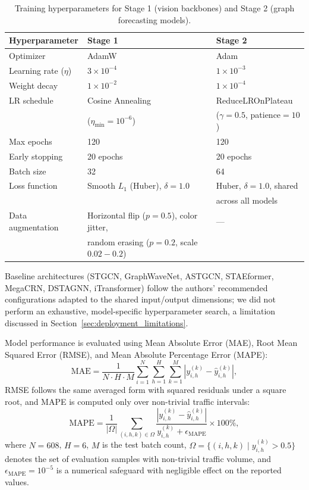 \documentclass[preprint,12pt]{elsarticle}
\begin{document}
\begin{table}[h]
\centering
\small
\caption{Training hyperparameters for Stage 1 (vision backbones) and Stage 2 (graph forecasting models).}
\label{tab:hyperparams}
\begin{tabular}{lll}
\toprule
\textbf{Hyperparameter} & \textbf{Stage 1} & \textbf{Stage 2} \\
\midrule
Optimizer & AdamW & Adam \citep{adam} \\
Learning rate ($\eta$) & $3\times10^{-4}$ & $1\times10^{-3}$ \\
Weight decay & $1\times10^{-2}$ & $1\times10^{-4}$ \\
LR schedule & Cosine Annealing & ReduceLROnPlateau \\
&($\eta_{\min}=10^{-6}$)  & ($\gamma=0.5$, patience$=10$) \\

Max epochs & 120 & 120 \\
Early stopping & 20 epochs & 20 epochs \\
Batch size & 32 & 64 \\
Loss function & Smooth $L_1$ (Huber), $\delta=1.0$  & Huber, $\delta=1.0$, shared\\
&  &  across all models \\

Data augmentation & Horizontal flip ($p{=}0.5$), color jitter, & --- \\
&   random erasing ($p{=}0.2$, scale $0.02{-}0.2$) &  \\

\bottomrule
\end{tabular}
\end{table}

Baseline architectures (STGCN, GraphWaveNet, ASTGCN, STAEformer, MegaCRN, DSTAGNN, iTransformer) follow the authors' recommended configurations adapted to the shared input/output dimensions; we did not perform an exhaustive, model-specific hyperparameter search, a limitation discussed in Section~\ref{sec:deployment_limitations}.

Model performance is evaluated using Mean Absolute Error (MAE), Root Mean Squared Error (RMSE), and Mean Absolute Percentage Error (MAPE):
\begin{equation}
\text{MAE}
=
\frac{1}{N \cdot H \cdot M}
\sum_{i=1}^{N}
\sum_{h=1}^{H}
\sum_{k=1}^{M}
\left|
y_{i,h}^{(k)}-\hat{y}_{i,h}^{(k)}
\right|,
\end{equation}
RMSE follows the same averaged form with squared residuals under a square root, and MAPE is computed only over non-trivial traffic intervals:
\begin{equation}
\text{MAPE}
=
\frac{1}{|\Omega|}
\sum_{(i,h,k)\in\Omega}
\frac{
\left|
y_{i,h}^{(k)}-\hat{y}_{i,h}^{(k)}
\right|
}{
y_{i,h}^{(k)}+\epsilon_{\mathrm{MAPE}}
}
\times 100\%,
\end{equation}
where $N=608$, $H=6$, $M$ is the test batch count,
$\Omega=\{(i,h,k)\mid y_{i,h}^{(k)}>0.5\}$ denotes the set of evaluation samples with non-trivial traffic volume, and
$\epsilon_{\mathrm{MAPE}}=10^{-5}$ is a numerical safeguard with negligible effect on the reported values.
\end{document}
